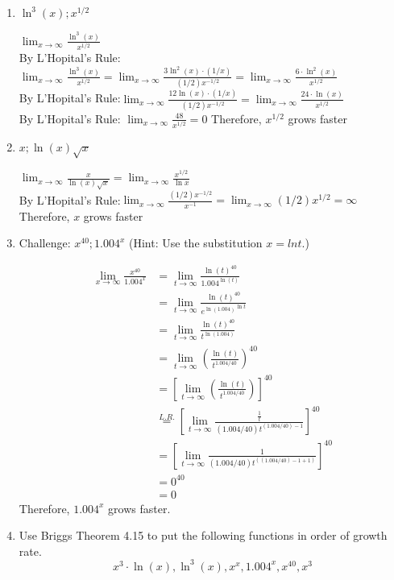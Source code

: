 \documentclass[nooutcomes,handout]{ximera}
\begin{document}
\begin{problem}
\begin{enumerate}
\begin{freeResponse}
		\end{freeResponse}
	\item $\ln^{3} (x); x^{1/2}$
		\begin{freeResponse}
	$\lim_{x \to \infty}\frac{\ln^{3}(x)}{x^{1/2}}$\\
	By L'Hopital's Rule:$\lim_{x \to \infty}\frac{\ln^{3}(x)}{x^{1/2}}=\lim_{x \to \infty}\frac{3\ln^2 (x) \cdot (1/x)}{(1/2)x^{-1/2}}=\lim_{x \to \infty}\frac{6 \cdot \ln^2 (x)}{x^{1/2}}$\\
	By L'Hopital's Rule:$\lim_{x \to \infty}\frac{12\ln (x) \cdot (1/x)}{(1/2)x^{-1/2}}=\lim_{x \to \infty}\frac{24 \cdot \ln (x)}{x^{1/2}}$\\
	By L'Hopital's Rule: $\lim_{x \to \infty}\frac{48}{x^{1/2}}=0$
	Therefore, $x^{1/2}$ grows faster
		\end{freeResponse}
	
	\item $x; \ln(x)\sqrt{x}$
		\begin{freeResponse}
	
	$\lim_{x \to \infty}\frac{x}{\ln (x)\sqrt{x}}=\lim_{x \to \infty}\frac{x^{1/2}}{\ln x}$\\
	By L'Hopital's Rule:$\lim_{x \to \infty}\frac{(1/2)x^{-1/2}}{x^{-1}}=\lim_{x \to \infty}{(1/2)x^{1/2}}=\infty$\\
		Therefore, $x$ grows faster
		\end{freeResponse}
		
		\item Challenge: $x^{40}; 1.004^x$ (Hint: Use the substitution $x=lnt$.)
			\begin{freeResponse}
			\begin{align*}
			\lim_{x \to \infty}\frac{x^{40}}{1.004^x} &=\lim_{t \to \infty}\frac{\ln (t)^{40}}{1.004^{\ln(t)}}\\
			&=\lim_{t \to \infty}\frac{\ln (t)^{40}}{{e^{\ln(1.004)}}^{\ln t}}\\
			&=\lim_{t \to \infty}\frac{\ln (t)^{40}}{t^{\ln(1.004)}}\\
			&=\lim_{t \to \infty}\left(\frac{\ln(t)}{t^{1.004/40}}\right)^{40}\\
			&=\left[\lim_{t \to \infty}\left(\frac{\ln(t)}{t^{1.004/40}}\right)\right]^{40}\\
			&\stackrel{L.R.}{=} \left[\lim_{t \to \infty}\frac{\frac{1}{t}}{(1.004/40)t^{(1.004/40)-1}}\right]^{40}\\
			&=\left[\lim_{t \to \infty}\frac{1}{(1.004/40)t^{((1.004/40)-1+1)}}\right]^{40}\\
			&=0^{40}\\
			&=0	
				\end{align*}
		Therefore, $1.004^x$ grows faster.
		\end{freeResponse}
	\item Use Briggs Theorem 4.15 to put the following functions in order of growth rate.\\
	$$x^3 \cdot \ln(x), \ln^{3} (x), x^x, 1.004^x, x^{40}, x^3$$
	

\end{enumerate}
\end{problem}
\end{document}
